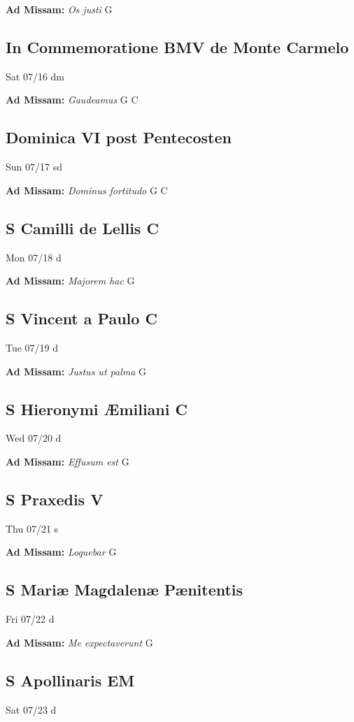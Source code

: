 \documentclass[letterpaper, 10pt, twocolumn]{article}
\begin{document}
\textbf{Ad Missam:} \textit{Os justi} G 

\subsection*{In Commemoratione BMV de Monte Carmelo}Sat 07/16 dm

\textbf{Ad Missam:} \textit{Gaudeamus} G C 

\subsection*{Dominica VI post Pentecosten}Sun 07/17 sd

\textbf{Ad Missam:} \textit{Dominus fortitudo} G C 

\subsection*{S Camilli de Lellis C}Mon 07/18 d

\textbf{Ad Missam:} \textit{Majorem hac} G 

\subsection*{S Vincent a Paulo C}Tue 07/19 d

\textbf{Ad Missam:} \textit{Justus ut palma} G 

\subsection*{S Hieronymi Æmiliani C}Wed 07/20 d

\textbf{Ad Missam:} \textit{Effusum est} G 

\subsection*{S Praxedis V}Thu 07/21 s

\textbf{Ad Missam:} \textit{Loquebar} G 

\subsection*{S Mariæ Magdalenæ Pænitentis}Fri 07/22 d

\textbf{Ad Missam:} \textit{Me expectaverunt} G 

\subsection*{S Apollinaris EM}Sat 07/23 d
\end{document}
